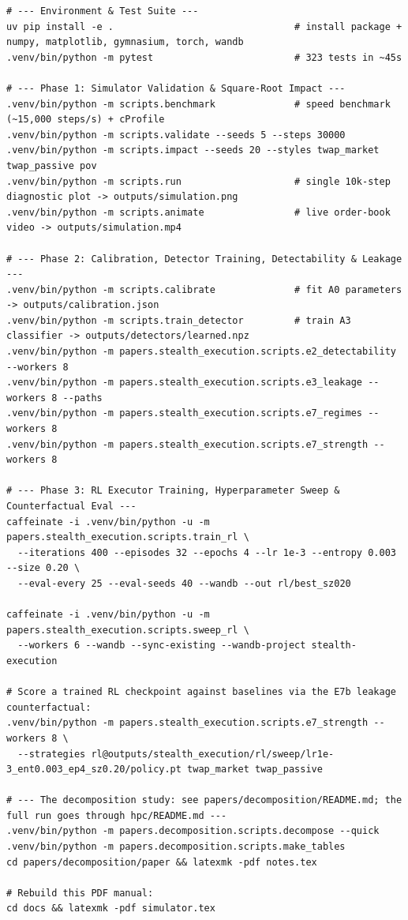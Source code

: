 \documentclass[11pt,a4paper]{article}
\begin{document}
\begin{lstlisting}
# --- Environment & Test Suite ---
uv pip install -e .                                # install package + numpy, matplotlib, gymnasium, torch, wandb
.venv/bin/python -m pytest                         # 323 tests in ~45s

# --- Phase 1: Simulator Validation & Square-Root Impact ---
.venv/bin/python -m scripts.benchmark              # speed benchmark (~15,000 steps/s) + cProfile
.venv/bin/python -m scripts.validate --seeds 5 --steps 30000
.venv/bin/python -m scripts.impact --seeds 20 --styles twap_market twap_passive pov
.venv/bin/python -m scripts.run                    # single 10k-step diagnostic plot -> outputs/simulation.png
.venv/bin/python -m scripts.animate                # live order-book video -> outputs/simulation.mp4

# --- Phase 2: Calibration, Detector Training, Detectability & Leakage ---
.venv/bin/python -m scripts.calibrate              # fit A0 parameters -> outputs/calibration.json
.venv/bin/python -m scripts.train_detector         # train A3 classifier -> outputs/detectors/learned.npz
.venv/bin/python -m papers.stealth_execution.scripts.e2_detectability --workers 8
.venv/bin/python -m papers.stealth_execution.scripts.e3_leakage --workers 8 --paths
.venv/bin/python -m papers.stealth_execution.scripts.e7_regimes --workers 8
.venv/bin/python -m papers.stealth_execution.scripts.e7_strength --workers 8

# --- Phase 3: RL Executor Training, Hyperparameter Sweep & Counterfactual Eval ---
caffeinate -i .venv/bin/python -u -m papers.stealth_execution.scripts.train_rl \
  --iterations 400 --episodes 32 --epochs 4 --lr 1e-3 --entropy 0.003 --size 0.20 \
  --eval-every 25 --eval-seeds 40 --wandb --out rl/best_sz020

caffeinate -i .venv/bin/python -u -m papers.stealth_execution.scripts.sweep_rl \
  --workers 6 --wandb --sync-existing --wandb-project stealth-execution

# Score a trained RL checkpoint against baselines via the E7b leakage counterfactual:
.venv/bin/python -m papers.stealth_execution.scripts.e7_strength --workers 8 \
  --strategies rl@outputs/stealth_execution/rl/sweep/lr1e-3_ent0.003_ep4_sz0.20/policy.pt twap_market twap_passive

# --- The decomposition study: see papers/decomposition/README.md; the full run goes through hpc/README.md ---
.venv/bin/python -m papers.decomposition.scripts.decompose --quick
.venv/bin/python -m papers.decomposition.scripts.make_tables
cd papers/decomposition/paper && latexmk -pdf notes.tex

# Rebuild this PDF manual:
cd docs && latexmk -pdf simulator.tex
\end{lstlisting}
\end{document}
